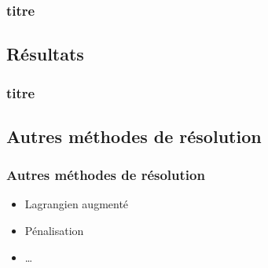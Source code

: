 \documentclass[11pt,envcountsect,aspectratio=169]{beamer} %
\begin{document}
\begin{frame}
	\frametitle{titre}

	

\end{frame}




\subsection{Résultats}

\begin{frame}
	\frametitle{titre}

	

\end{frame}





\subsection{Autres méthodes de résolution}

\begin{frame}
	\frametitle{Autres méthodes de résolution}

	\begin{itemize}
		\item Lagrangien augmenté
		\item Pénalisation
		\item \dots
	\end{itemize}

\end{frame}
\end{document}

